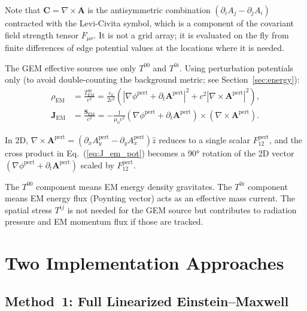\documentclass[11pt,a4paper]{article}
\newcommand{\vv}[1]{\mathbf{#1}}
\begin{document}
Note that $\vv{C} = \nabla\times\vv{A}$ is the antisymmetric combination $(\partial_i A_j - \partial_j A_i)$ contracted with the Levi-Civita symbol, which is a component of the covariant field strength tensor $F_{\mu\nu}$.  It is not a grid array; it is evaluated on the fly from finite differences of edge potential values at the locations where it is needed.

The GEM effective sources use only $T^{00}$ and $T^{0i}$.  Using perturbation potentials only (to avoid double-counting the background metric; see Section~\ref{sec:energy}):
\begin{align}
  \rho_{\mathrm{EM}} &= \frac{T^{00}_{\mathrm{EM}}}{c^2}
    = \frac{\varepsilon_0}{2c^2}\!\left(|\nabla\phi^{\mathrm{pert}} + \partial_t\vv{A}^{\mathrm{pert}}|^2
      + c^2|\nabla\times\vv{A}^{\mathrm{pert}}|^2\right), \label{eq:rho_em_pot}\\
  \vv{J}_{\mathrm{EM}} &= \frac{\vv{S}_{\mathrm{EM}}}{c^2}
    = -\frac{1}{\mu_0 c^2}\!\left(\nabla\phi^{\mathrm{pert}} + \partial_t\vv{A}^{\mathrm{pert}}\right)
      \times\!\left(\nabla\times\vv{A}^{\mathrm{pert}}\right). \label{eq:J_em_pot}
\end{align}

In 2D, $\nabla\times\vv{A}^{\mathrm{pert}} = (\partial_x A_y^{\mathrm{pert}} - \partial_y A_x^{\mathrm{pert}})\hat{z}$ reduces to a single scalar $F_{12}^{\mathrm{pert}}$, and the cross product in Eq.~(\ref{eq:J_em_pot}) becomes a 90° rotation of the 2D vector $(\nabla\phi^{\mathrm{pert}}+\partial_t\vv{A}^{\mathrm{pert}})$ scaled by $F_{12}^{\mathrm{pert}}$.

The $T^{00}$ component means EM energy density gravitates.  The $T^{0i}$ component means EM energy flux (Poynting vector) acts as an effective mass current.  The spatial stress $T^{ij}$ is not needed for the GEM source but contributes to radiation pressure and EM momentum flux if those are tracked.

\section{Two Implementation Approaches}

\subsection{Method~1: Full Linearized Einstein--Maxwell}
\end{document}
